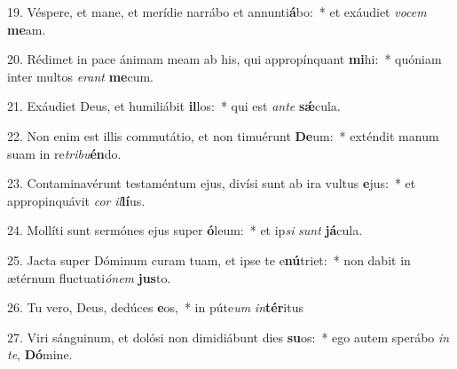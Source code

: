 19. Véspere, et mane, et merídie narrábo et annunti\textbf{á}bo:~*  et exáudiet \textit{vo}\textit{cem} \textbf{me}am.\

20. Rédimet in pace ánimam meam ab his, qui appropínquant \textbf{mi}hi:~*  quóniam inter multos \textit{e}\textit{rant} \textbf{me}cum.\

21. Exáudiet Deus, et humiliábit \textbf{il}los:~*  qui est \textit{an}\textit{te} \textbf{sǽ}cula.\

22. Non enim est illis commutátio, et non timuérunt \textbf{De}um:~*  exténdit manum suam in re\textit{tri}\textit{bu}\textbf{én}do.\

23. Contaminavérunt testaméntum ejus, divísi sunt ab ira vultus \textbf{e}jus:~*  et appropinquávit \textit{cor} \textit{il}\textbf{lí}us.\

24. Mollíti sunt sermónes ejus super \textbf{ó}leum:~*  et ip\textit{si} \textit{sunt} \textbf{já}cula.\

25. Jacta super Dóminum curam tuam, et ipse te e\textbf{nú}triet:~*  non dabit in ætérnum fluctuati\textit{ó}\textit{nem} \textbf{jus}to.\

26. Tu vero, Deus, dedúces \textbf{e}os,~*  in púte\textit{um} \textit{in}\textbf{tér}itus\

27. Viri sánguinum, et dolósi non dimidiábunt dies \textbf{su}os:~*  ego autem sperábo \textit{in} \textit{te}, \textbf{Dó}mine.\

